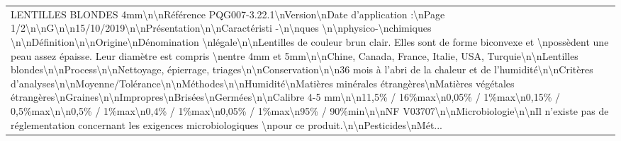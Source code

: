 \begin{tabular}{p{\linewidth}}
 LENTILLES BLONDES 4mm\textbackslash n\textbackslash nRéférence PQG007-3.22.1\textbackslash nVersion\textbackslash nDate d'application :\textbackslash nPage 1/2\textbackslash n\textbackslash nG\textbackslash n\textbackslash n15/10/2019\textbackslash n\textbackslash nPrésentation\textbackslash n\textbackslash nCaractéristi -\textbackslash n\textbackslash nques \textbackslash n\textbackslash nphysico-\textbackslash nchimiques \textbackslash n\textbackslash nDéfinition\textbackslash n\textbackslash nOrigine\textbackslash nDénomination \textbackslash nlégale\textbackslash n\textbackslash nLentilles de couleur brun clair. Elles sont de forme biconvexe et \textbackslash npossèdent une peau assez épaisse. Leur diamètre est compris \textbackslash nentre 4mm et 5mm\textbackslash n\textbackslash nChine, Canada, France, Italie, USA, Turquie\textbackslash n\textbackslash nLentilles blondes\textbackslash n\textbackslash nProcess\textbackslash n\textbackslash nNettoyage, épierrage, triages\textbackslash n\textbackslash nConservation\textbackslash n\textbackslash n36 mois à l'abri de la chaleur et de l'humidité\textbackslash n\textbackslash nCritères d'analyses\textbackslash n\textbackslash nMoyenne/Tolérance\textbackslash n\textbackslash nMéthodes\textbackslash n\textbackslash nHumidité\textbackslash nMatières minérales étrangères\textbackslash nMatières végétales étrangères\textbackslash nGraines\textbackslash n\textbackslash nImpropres\textbackslash nBrisées\textbackslash nGermées\textbackslash n\textbackslash nCalibre 4-5 mm\textbackslash n\textbackslash n11,5\% / 16\%max\textbackslash n0,05\% / 1\%max\textbackslash n0,15\% / 0,5\%max\textbackslash n\textbackslash n0,5\% / 1\%max\textbackslash n0,4\% / 1\%max\textbackslash n0,05\% / 1\%max\textbackslash n95\% / 90\%min\textbackslash n\textbackslash nNF V03707\textbackslash n\textbackslash nMicrobiologie\textbackslash n\textbackslash nIl n'existe pas de réglementation concernant les exigences microbiologiques \textbackslash npour ce produit.\textbackslash n\textbackslash nPesticides\textbackslash nMét... \\

\end{tabular}
